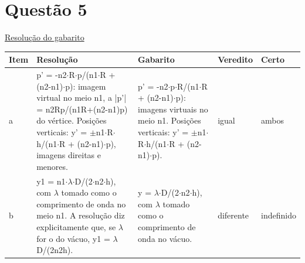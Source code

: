 \documentclass{article}%
\begin{document}
\section*{Questão 5}%
\href{https://poliedroresolve.sistemapoliedro.com.br/vestibulares/ita/2027/ita-2-fase-dia-3-22-10-2026-2-fase-dia-3/dissertativa-5-fisica-2-fase-dia-3-ita-2027}{Resolução do gabarito}\par\smallskip%
\begin{longtable}{@{}p{} p{} p{} p{} p{}@{}}\toprule Item & Resolução & Gabarito & Veredito & Certo \\ \midrule
a & p' = -n2$\cdot$R$\cdot$p/(n1$\cdot$R + (n2-n1)$\cdot$p): imagem virtual no meio n1, a |p'| = n2Rp/(n1R+(n2-n1)p) do vértice. Posições verticais: y' = $\pm$n1$\cdot$R$\cdot$h/(n1$\cdot$R + (n2-n1)$\cdot$p), imagens direitas e menores. & p' = -n2$\cdot$p$\cdot$R/(n1$\cdot$R + (n2-n1)$\cdot$p): imagens virtuais no meio n1. Posições verticais: y' = $\pm$n1$\cdot$R$\cdot$h/(n1$\cdot$R + (n2-n1)$\cdot$p). & igual & ambos \\
b & y1 = n1$\cdot$$\lambda$$\cdot$D/(2$\cdot$n2$\cdot$h), com $\lambda$ tomado como o comprimento de onda no meio n1. A resolução diz explicitamente que, se $\lambda$ for o do vácuo, y1 = $\lambda$D/(2n2h). & y = $\lambda$$\cdot$D/(2$\cdot$n2$\cdot$h), com $\lambda$ tomado como o comprimento de onda no vácuo. & diferente & indefinido \\
\bottomrule\end{longtable}%
\end{document}
